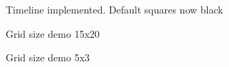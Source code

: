 \documentclass[11pt]{article} %
\begin{document}
{  \begin{figure}[H]
  	\centering
  	\caption{Timeline implemented. Default squares now black}
  	\label{fig:GUI Design 5}
  \end{figure}  
  
  \begin{figure}[H]
  	\centering
  	\caption{Grid size demo 15x20}
  	\label{fig:GUI Design 5 size demo 1}
  \end{figure} 
  
  \begin{figure}[H]
  	\centering
  	\caption{Grid size demo 5x3}
  	\label{fig:GUI Design 5 size demo 2}
  \end{figure} 
  
}
\end{document}
